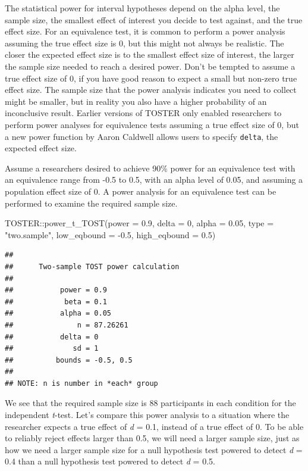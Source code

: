 \documentclass[
  oneside]{krantz}
\makeatletter
\newenvironment{Shaded}{\begin{snugshade}}{\end{snugshade}}
\newcommand{\AttributeTok}[1]{\textcolor[rgb]{0.61,0.61,0.61}{#1}}
\newcommand{\DecValTok}[1]{\textcolor[rgb]{0.06,0.06,0.06}{#1}}
\newcommand{\FloatTok}[1]{\textcolor[rgb]{0.06,0.06,0.06}{#1}}
\newcommand{\FunctionTok}[1]{\textcolor[rgb]{0,0,0}{#1}}
\newcommand{\NormalTok}[1]{#1}
\newcommand{\SpecialCharTok}[1]{\textcolor[rgb]{0,0,0}{#1}}
\newcommand{\StringTok}[1]{\textcolor[rgb]{0.5,0.5,0.5}{#1}}
\newenvironment{kframe}{%
\medskip{}
\setlength{\fboxsep}{.8em}
 \def\at@end@of@kframe{}%
 \ifinner\ifhmode%
  \def\at@end@of@kframe{\end{minipage}}%
  \begin{minipage}{\columnwidth}%
 \fi\fi%
 \def\FrameCommand##1{\hskip\@totalleftmargin \hskip-\fboxsep
 \colorbox{shadecolor}{##1}\hskip-\fboxsep
     \hskip-\linewidth \hskip-\@totalleftmargin \hskip\columnwidth}%
 \MakeFramed {\advance\hsize-\width
   \@totalleftmargin\z@ \linewidth\hsize
   \@setminipage}}%
 {\par\unskip\endMakeFramed%
 \at@end@of@kframe}
\renewenvironment{Shaded}{\begin{kframe}}{\end{kframe}}
\makeatother
\begin{document}
The statistical power for interval hypotheses depend on the alpha level, the sample size, the smallest effect of interest you decide to test against, and the true effect size. For an equivalence test, it is common to perform a power analysis assuming the true effect size is 0, but this might not always be realistic. The closer the expected effect size is to the smallest effect size of interest, the larger the sample size needed to reach a desired power. Don't be tempted to assume a true effect size of 0, if you have good reason to expect a small but non-zero true effect size. The sample size that the power analysis indicates you need to collect might be smaller, but in reality you also have a higher probability of an inconclusive result. Earlier versions of TOSTER only enabled researchers to perform power analyses for equivalence tests assuming a true effect size of 0, but a new power function by Aaron Caldwell allows users to specify \texttt{delta}, the expected effect size.

Assume a researchers desired to achieve 90\% power for an equivalence test with an equivalence range from -0.5 to 0.5, with an alpha level of 0.05, and assuming a population effect size of 0. A power analysis for an equivalence test can be performed to examine the required sample size.

\begin{Shaded}
\begin{Highlighting}[]
\NormalTok{TOSTER}\SpecialCharTok{::}\FunctionTok{power\_t\_TOST}\NormalTok{(}\AttributeTok{power =} \FloatTok{0.9}\NormalTok{, }\AttributeTok{delta =} \DecValTok{0}\NormalTok{,}
                     \AttributeTok{alpha =} \FloatTok{0.05}\NormalTok{, }\AttributeTok{type =} \StringTok{"two.sample"}\NormalTok{,}
                     \AttributeTok{low\_eqbound =} \SpecialCharTok{{-}}\FloatTok{0.5}\NormalTok{, }\AttributeTok{high\_eqbound =} \FloatTok{0.5}\NormalTok{)}
\end{Highlighting}
\end{Shaded}

\begin{verbatim}
## 
##      Two-sample TOST power calculation 
## 
##           power = 0.9
##            beta = 0.1
##           alpha = 0.05
##               n = 87.26261
##           delta = 0
##              sd = 1
##          bounds = -0.5, 0.5
## 
## NOTE: n is number in *each* group
\end{verbatim}

We see that the required sample size is 88 participants in each condition for the independent \emph{t}-test. Let's compare this power analysis to a situation where the researcher expects a true effect of \emph{d} = 0.1, instead of a true effect of 0. To be able to reliably reject effects larger than 0.5, we will need a larger sample size, just as how we need a larger sample size for a null hypothesis test powered to detect \emph{d} = 0.4 than a null hypothesis test powered to detect \emph{d} = 0.5.
\end{document}
